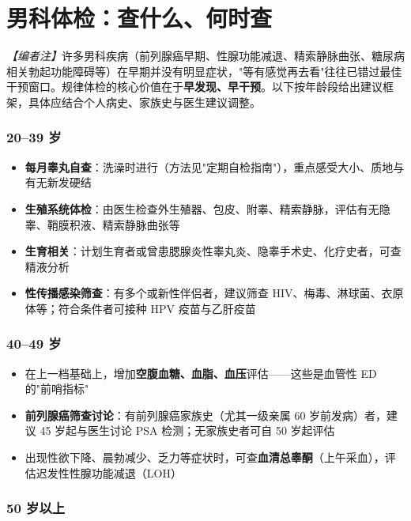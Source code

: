 \section{男科体检：查什么、何时查}

\noindent\textit{【编者注】}许多男科疾病（前列腺癌早期、性腺功能减退、精索静脉曲张、糖尿病相关勃起功能障碍等）在早期并没有明显症状，"等有感觉再去看"往往已错过最佳干预窗口。规律体检的核心价值在于\textbf{早发现、早干预}。以下按年龄段给出建议框架，具体应结合个人病史、家族史与医生建议调整。

\subsubsection{20--39 岁}

\begin{itemize}
	\item \textbf{每月睾丸自查}：洗澡时进行（方法见"定期自检指南"），重点感受大小、质地与有无新发硬结
	\item \textbf{生殖系统体检}：由医生检查外生殖器、包皮、附睾、精索静脉，评估有无隐睾、鞘膜积液、精索静脉曲张等
	\item \textbf{生育相关}：计划生育者或曾患腮腺炎性睾丸炎、隐睾手术史、化疗史者，可查精液分析
	\item \textbf{性传播感染筛查}：有多个或新性伴侣者，建议筛查 HIV、梅毒、淋球菌、衣原体等；符合条件者可接种 HPV 疫苗与乙肝疫苗
\end{itemize}

\subsubsection{40--49 岁}

\begin{itemize}
	\item 在上一档基础上，增加\textbf{空腹血糖、血脂、血压}评估——这些是血管性 ED 的"前哨指标"
	\item \textbf{前列腺癌筛查讨论}：有前列腺癌家族史（尤其一级亲属 60 岁前发病）者，建议 45 岁起与医生讨论 PSA 检测；无家族史者可自 50 岁起评估
	\item 出现性欲下降、晨勃减少、乏力等症状时，可查\textbf{血清总睾酮}（上午采血），评估迟发性性腺功能减退（LOH）
\end{itemize}

\subsubsection{50 岁以上}

